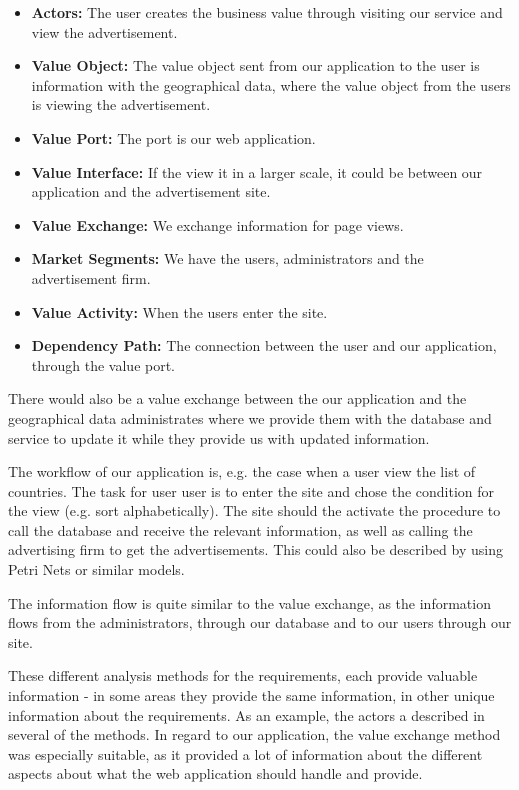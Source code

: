  \begin{itemize}

\item \textbf{Actors:} The user creates the business value through visiting our service and view the advertisement.
\item \textbf{Value Object:} The value object sent from our application to the user is information with the geographical data, where the value object from the users is viewing the advertisement.
\item \textbf{Value Port:} The port is our web application.
\item \textbf{Value Interface:} If the view it in a larger scale, it could be between our application and the advertisement site.
\item \textbf{Value Exchange:} We exchange information for page views.
\item \textbf{Market Segments:} We have the users, administrators and the advertisement firm.
\item \textbf{Value Activity:} When the users enter the site.
\item \textbf{Dependency Path:} The connection between the user and our application, through the value port. 
\end{itemize}

There would also be a value exchange between the our application and the geographical data administrates where we provide them with the database and service to update it while they provide us with updated information.

The workflow of our application is, e.g. the case when a user view the list of countries. The task for user user is to enter the site and chose the condition for the view (e.g. sort alphabetically). The site should the activate the procedure to call the database and receive the relevant information, as well as calling the advertising firm to get the advertisements. This could also be described by using Petri Nets or similar models.

The information flow is quite similar to the value exchange, as the information flows from the administrators, through our database and to our users through our site.

These different analysis methods for the requirements, each provide valuable information - in some areas they provide the same information, in other unique information about the requirements. As an example, the actors a described in several of the methods. In regard to our application, the value exchange method was especially suitable, as it provided a lot of information about the different aspects about what the web application should handle and provide.
